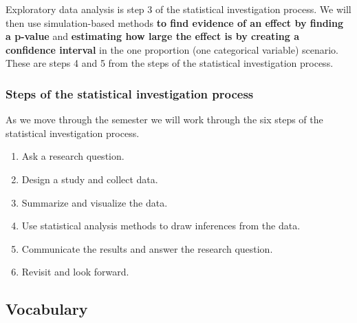 \documentclass[
]{report}
\begin{document}
Exploratory data analysis is step 3 of the statistical investigation process. We will then use simulation-based methods \textbf{to find evidence of an effect by finding a p-value} and \textbf{estimating how large the effect is by creating a confidence interval} in the one proportion (one categorical variable) scenario. These are steps 4 and 5 from the steps of the statistical investigation process.

\subsubsection*{Steps of the statistical investigation process}\label{steps-of-the-statistical-investigation-process}

As we move through the semester we will work through the six steps of the statistical investigation process.

\begin{enumerate}
\def\labelenumi{\arabic{enumi}.}
\item
  Ask a research question.
\item
  Design a study and collect data.
\item
  Summarize and visualize the data.
\item
  Use statistical analysis methods to draw inferences from the data.
\item
  Communicate the results and answer the research question.
\item
  Revisit and look forward.
\end{enumerate}

\subsection{Vocabulary}\label{vocabulary-2}
\end{document}
